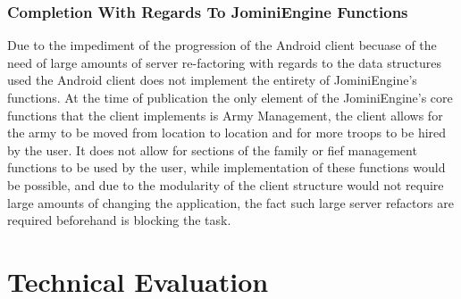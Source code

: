 \documentclass{article}
\begin{document}
\subsubsection{Completion With Regards To JominiEngine Functions}
Due to the impediment of the progression of the Android client becuase of the need of large amounts of server re-factoring with regards to the data structures used the Android client does not implement the entirety of JominiEngine's functions. At the time of publication the only element of the JominiEngine's core functions that the client implements is Army Management, the client allows for the army to be moved from location to location and for more troops to be hired by the user. It does not allow for sections of the family or fief management functions to be used by the user, while implementation of these functions would be possible, and due to the modularity of the client structure would not require large amounts of changing the application, the fact such large server refactors are required beforehand is blocking the task.
\section{Technical Evaluation}
\end{document}
